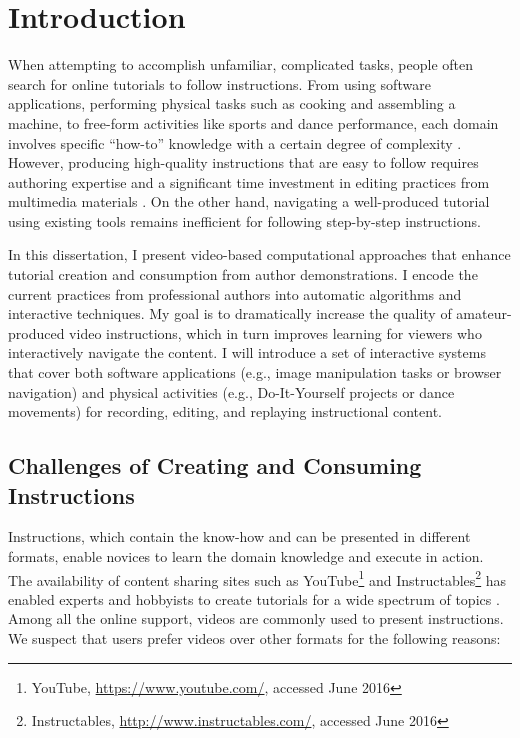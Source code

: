 \chapter{Introduction}
\label{chapter_introduction}

When attempting to accomplish unfamiliar, complicated tasks, people often search for online tutorials to follow instructions. From using software applications, performing physical tasks such as cooking and assembling a machine, to free-form activities like sports and dance performance, each domain involves specific ``how-to'' knowledge with a certain degree of complexity \cite{ryle1945knowhow}.
%
However, producing high-quality instructions that are easy to follow requires authoring expertise and a significant time investment in editing practices from multimedia materials \cite{Muller:2009tw}. On the other hand, navigating a well-produced tutorial using existing tools remains inefficient for following step-by-step instructions.

In this dissertation, I present video-based computational approaches that enhance tutorial creation and consumption from author demonstrations. I encode the current practices from professional authors into automatic algorithms and interactive techniques.
%
My goal is to dramatically increase the quality of amateur-produced video instructions, which in turn improves learning for viewers who interactively navigate the content. I will introduce a set of interactive systems that cover both software applications (e.g., image manipulation tasks or browser navigation) and physical activities (e.g., Do-It-Yourself projects or dance movements) for recording, editing, and replaying instructional content.


\section{Challenges of Creating and Consuming Instructions}

Instructions, which contain the know-how and can be presented in different formats, enable novices to learn the domain knowledge and execute in action. The availability of content sharing sites such as YouTube\footnote{YouTube, \url{https://www.youtube.com/}, accessed June 2016} and Instructables\footnote{Instructables, \url{http://www.instructables.com/}, accessed June 2016} has enabled experts and hobbyists to create tutorials for a wide spectrum of topics \cite{Lafreniere:2012tl}. Among all the online support, videos are commonly used to present instructions. We suspect that users prefer videos over other formats for the following reasons:

